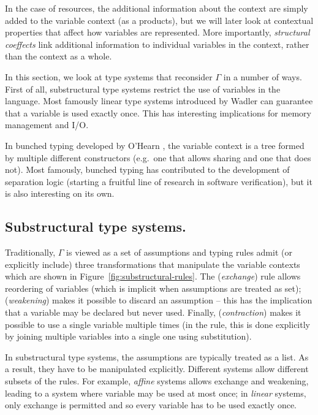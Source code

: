 In the case of resources, the additional information about the context are simply added to the
variable context (as a products), but we will later look at contextual properties that affect 
how variables are represented. More importantly, \emph{structural coeffects} link additional
information to individual variables in the context, rather than the context as a whole.

In this section, we look at type systems that reconsider $\Gamma$ in a number of ways. 
First of all, substructural type systems \cite{substruct-attpl-intro} restrict the use of variables
in the language. Most famously linear type systems introduced by Wadler \cite{substruct-linear-change} 
can guarantee that a variable is used exactly once. This has interesting implications for memory
management and I/O. 

In bunched typing developed by O'Hearn \cite{substruct-bunched}, the variable context is a tree 
formed by multiple different constructors (e.g.~one that allows sharing and one that does not). 
Most famously, bunched typing has contributed to the development of separation logic
\cite{substruct-separation-logic} (starting a fruitful line of research in software verification), 
but it is also interesting on its own. 


\subsection{Substructural type systems.}

Traditionally, $\Gamma$ is viewed as a set of assumptions and typing rules admit (or explicitly
include) three transformations that manipulate the variable contexts which are shown in 
Figure~\ref{fig:substructural-rules}. The (\emph{exchange}) rule allows reordering of variables
(which is implicit when assumptions are treated as set); (\emph{weakening}) makes it possible
to discard an assumption -- this has the implication that a variable may be declared but never
used. Finally, (\emph{contraction}) makes it possible to use a single variable multiple times
(in the rule, this is done explicitly by joining multiple variables into a single one using 
substitution).

In substructural type systems, the assumptions are typically treated as a list. As a result,
they have to be manipulated explicitly. Different systems allow different subsets of the rules.
For example, \emph{affine} systems allows exchange and weakening, leading to a system where 
variable may be used at most once; in \emph{linear} systems, only exchange is permitted and so 
every variable has to be used exactly once.

